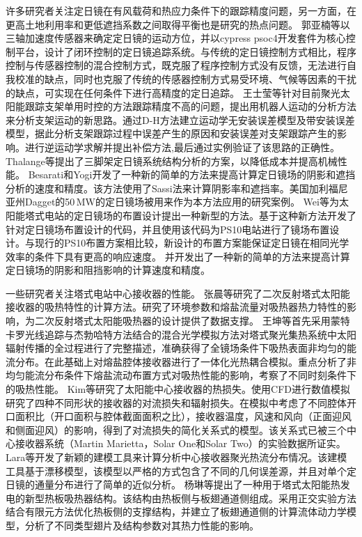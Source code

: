 许多研究者关注定日镜在有风载荷和热应力条件下的跟踪精度问题，另一方面，在更高土地利用率和更低遮挡系数之间取得平衡也是研究的热点问题。
郭亚楠等\cite{Guo2016}以三轴加速度传感器来确定定日镜的运动方位，并以cypress psoc4开发套件为核心控制平台，设计了闭环控制的定日镜追踪系统。与传统的定日镜控制方式相比，程序控制与传感器控制的混合控制方式，既克服了程序控制方式没有反馈，无法进行自我校准的缺点，同时也克服了传统的传感器控制方式易受环境、气候等因素的干扰的缺点，可实现在任何条件下进行高精度的定日追踪。
王士莹等\cite{Wang2017b}针对目前聚光太阳能跟踪支架单用时控的方法跟踪精度不高的问题，提出用机器人运动的分析方法来分析支架运动的新思路。通过D-H方法建立运动学无安装误差模型及带安装误差模型，据此分析支架跟踪过程中误差产生的原因和安装误差对支架跟踪产生的影响。进行逆运动学求解并提出补偿方法,最后通过实例验证了该思路的正确性。
Thalange等\cite{Thalange2017}提出了三脚架定日镜系统结构分析的方案，以降低成本并提高机械性能。
Besarati和Yogi\cite{Besarati2014}开发了一种新的简单的方法来提高计算定日镜场的阴影和遮挡分析的速度和精度。该方法使用了Sassi法\cite{Sassi1983}来计算阴影率和遮挡率。美国加利福尼亚州Dagget的50$\,\mathrm{MW}$的定日镜场被用来作为本方法应用的研究案例。
Wei等\cite{Wei2010}为太阳能塔式电站的定日镜场的布置设计提出一种新型的方法。基于这种新方法开发了针对定日镜场布置设计的代码，并且使用该代码为PS10电站进行了镜场布置设计。与现行的PS10布置方案相比较，新设计的布置方案能保证定日镜在相同光学效率的条件下具有更高的响应速度。
并开发出了一种新的简单的方法来提高计算定日镜场的阴影和阻挡影响的计算速度和精度。

一些研究者关注塔式电站中心接收器的性能。
张晨等\cite{Zhang2015}研究了二次反射塔式太阳能接收器的吸热特性的计算方法。研究了环境参数和熔盐流量对吸热器热力特性的影响，为二次反射塔式太阳能吸热器的设计提供了数据支撑。
王坤等\cite{Wang2016a}首先采用蒙特卡罗光线追踪与杰勃哈特方法结合的混合光学模拟方法对塔式聚光集热系统中太阳辐射传播的全过程进行了完整描述，准确获得了全镜场条件下吸热表面非均匀的能流分布。在此基础上对熔盐腔体接收器进行了一体化光热耦合模拟。重点分析了非均匀能流分布条件下熔盐流动布置方式对吸热性能的影响，考察了不同时刻条件下的吸热性能。
Kim等\cite{Kim2015}研究了太阳能中心接收器的热损失。使用CFD进行数值模拟研究了四种不同形状的接收器的对流损失和辐射损失。在模拟中考虑了不同腔体开口面积比（开口面积与腔体截面面积之比），接收器温度，风速和风向（正面迎风和侧面迎风）的影响，得到了对流损失的简化关系式的模型。该关系式已被三个中心接收器系统（Martin Marietta，Solar One和Solar Two）的实验数据所证实。
Lara等\cite{Lara2016}开发了新颖的建模工具来计算分析中心接收器聚光热流分布情况。该建模工具基于漂移模型，该模型以严格的方式包含了不同的几何误差源，并且对单个定日镜的通量分布进行了简单的近似分析。
杨琳等\cite{Yang2015}提出了一种用于塔式太阳能热发电的新型热板吸热器结构。该结构由热板侧与板翅通道侧组成。采用正交实验方法结合有限元方法优化热板侧的支撑结构，并建立了板翅通道侧的计算流体动力学模型，分析了不同类型翅片及结构参数对其热力性能的影响。

